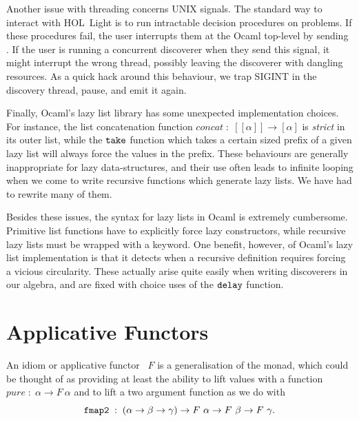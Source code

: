 
Another issue with threading concerns UNIX signals. The standard way to interact with HOL~Light is to run intractable decision procedures on problems. If these procedures fail, the user interrupts them at the Ocaml top-level by sending . If the user is running a concurrent discoverer when they send this signal, it might interrupt the wrong thread, possibly leaving the discoverer with dangling resources. As a quick hack around this behaviour, we trap SIGINT in the discovery thread, pause, and emit it again.

Finally, Ocaml's lazy list library has some unexpected implementation choices. For instance, the list concatenation function $concat\;:\;[[\alpha]]\rightarrow[\alpha]$ is \emph{strict} in its outer list, while the $\texttt{take}$ function which takes a certain sized prefix of a given lazy list will always force the values in the prefix. These behaviours are generally inappropriate for lazy data-structures, and their use often leads to infinite looping when we come to write recursive functions which generate lazy lists. We have had to rewrite many of them.

Besides these issues, the syntax for lazy lists in Ocaml is extremely cumbersome. Primitive list functions have to explicitly force lazy constructors, while recursive lazy lists must be wrapped with a  keyword. One benefit, however, of Ocaml's lazy list implementation is that it detects when a recursive definition requires forcing a vicious circularity. These actually arise quite easily when writing discoverers in our algebra, and are fixed with choice uses of the $\texttt{delay}$ function.

\section{Applicative Functors}\label{sec:Applicative}
An idiom or applicative functor~\cite{Applicative} $F$ is a generalisation of the monad, which could be thought of as providing at least the ability to lift values with a function $pure\;:\;\alpha \rightarrow F\ \alpha$ and to lift a two argument function as we do with 
\begin{displaymath}
\texttt{fmap2}\;:\;(\alpha\rightarrow\beta\rightarrow\gamma)\rightarrow F\ \alpha \rightarrow F\ \beta \rightarrow F\ \gamma.
\end{displaymath}

